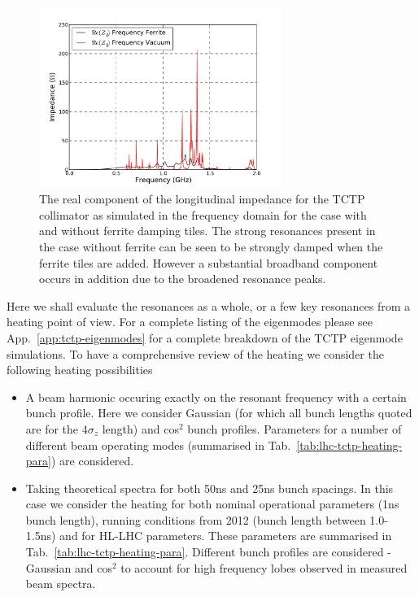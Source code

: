 \begin{figure}
\begin{center}
\includegraphics[width=0.7\textwidth]{LHC_Collimation_Upgrades/figures/longitudinal-impedance-tctp-ferr-freq-dom.pdf}
\end{center}
\caption{The real component of the longitudinal impedance for the TCTP collimator as simulated in the frequency domain for the case with and without ferrite damping tiles. The strong resonances present in the case without ferrite can be seen to be strongly damped when the ferrite tiles are added. However a substantial broadband component occurs in addition due to the broadened resonance peaks.}
\label{fig:long-imp-tctp-freq}
\end{figure}

Here we shall evaluate the resonances as a whole, or a few key resonances from a heating point of view. For a complete listing of the eigenmodes please see App.~\ref{app:tctp-eigenmodes} for a complete breakdown of the TCTP eigenmode simulations. To have a comprehensive review of the heating we consider the following heating possibilities

\begin{itemize}
\item{A beam harmonic occuring exactly on the resonant frequency with a certain bunch profile. Here we consider Gaussian (for which all bunch lengths quoted are for the $4\sigma_{z}$ length) and cos$^{2}$ bunch profiles. Parameters for a number of different beam operating modes (summarised in Tab.~\ref{tab:lhc-tctp-heating-para}) are considered.}
\item{Taking theoretical spectra for both 50ns and 25ns bunch spacings. In this case we consider the heating for both nominal operational parameters (1ns bunch length), running conditions from 2012 (bunch length between 1.0-1.5ns) and for HL-LHC parameters. These parameters are summarised in Tab.~\ref{tab:lhc-tctp-heating-para}. Different bunch profiles are considered - Gaussian and cos$^{2}$ to account for high frequency lobes observed in measured beam spectra.}
\end{itemize}

